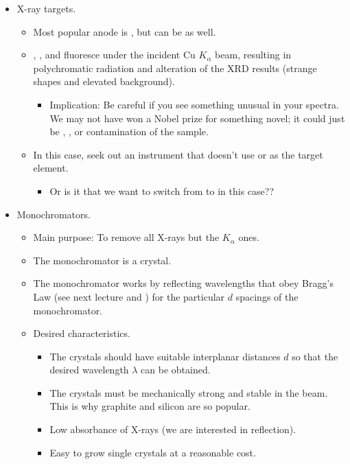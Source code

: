 \documentclass[../notes.tex]{subfiles}
\begin{document}
\begin{itemize}
\begin{itemize}
    \end{itemize}
    \item X-ray targets.
    \begin{itemize}
        \item Most popular anode is , but can be  as well.
        \item {}, , and  fluoresce under the incident Cu $K_\alpha$ beam, resulting in polychromatic radiation and alteration of the XRD results (strange shapes and elevated background).
        \begin{itemize}
            \item Implication: Be careful if you see something unusual in your spectra. We may not have won a Nobel prize for something novel; it could just be , , or  contamination of the sample.
        \end{itemize}
        \item In this case, seek out an instrument that doesn't use  or  as the target element.
        \begin{itemize}
            \item Or is it that we want to switch from  to  in this case??
        \end{itemize}
    \end{itemize}
    \item Monochromators.
    \begin{itemize}
        \item Main purpose: To remove all X-rays but the $K_\alpha$ ones.
        \item The monochromator is a crystal.
        \item The monochromator works by reflecting wavelengths that obey Bragg's Law (see next lecture and \textcite{bib:CHEM26300Notes}) for the particular $d$ spacings of the monochromator.
        \item Desired characteristics.
        \begin{itemize}
            \item The crystals should have suitable interplanar distances $d$ so that the desired wavelength $\lambda$ can be obtained.
            \item The crystals must be mechanically strong and stable in the beam. This is why graphite and silicon are so popular.
            \item Low absorbance of X-rays (we are interested in reflection).
            \item Easy to grow single crystals at a reasonable cost.

\end{itemize}
\end{itemize}
\end{itemize}
\end{document}
